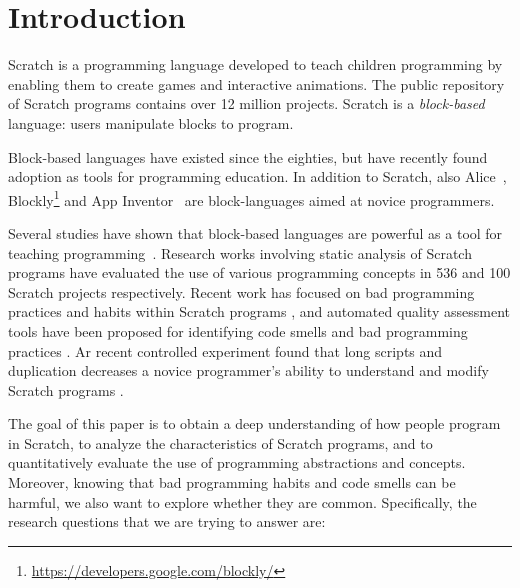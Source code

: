 \documentclass{sig-alternate}
\begin{document}



\section{Introduction}

Scratch is a programming language developed to teach children programming by enabling them to create games and interactive animations. The public repository of Scratch programs contains over 12 million projects. Scratch is a \emph{block-based} language: users manipulate blocks to program.

Block-based languages have existed since the eighties, but have recently found adoption as tools for programming education. In addition to Scratch, also Alice~\cite{conway_alice:_1994}, Blockly\footnote{\url{https://developers.google.com/blockly/}} and App Inventor~\cite{wolber_app_2011} are block-languages aimed at novice programmers.

Several studies have shown that block-based languages are powerful as a tool for teaching programming~\cite{meerbaum-salant_learning_2010, b._moskal_evaluating_2005,cooper_teaching_2003}. Research works involving static analysis of Scratch programs \cite{Maloney_2008} \cite{moreno_automatic_2014} have evaluated the use of various programming concepts in 536 and 100 Scratch projects respectively. Recent work has focused on bad programming practices and habits within Scratch programs \cite{Meerbaum_habits_2011}, and automated quality assessment tools have been proposed for identifying code smells and bad programming practices \cite{boe_hairball:_2013}\cite{moreno_automatic_2014}. Ar recent controlled experiment found that long scripts and duplication decreases a novice programmer's ability to understand and modify Scratch programs \cite{hermans_2016}.

The goal of this paper is to obtain a deep understanding of how people program in Scratch, to analyze the characteristics of Scratch programs, and to quantitatively evaluate the use of programming abstractions and concepts. Moreover, knowing that bad programming habits and code smells can be harmful, we also want to explore whether they are common. Specifically, the research questions that we are trying to answer are:
\end{document}
